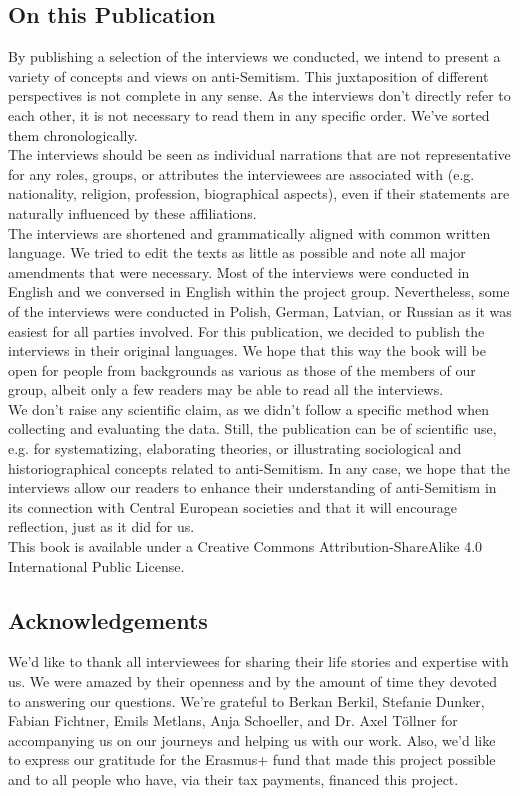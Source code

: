 \subsection*{On this Publication}
By publishing a selection of the interviews we conducted, we intend to present a variety of concepts and views on anti-Semitism. This juxtaposition of different perspectives is not complete in any sense. As the interviews don’t directly refer to each other, it is not necessary to read them in any specific order. We've sorted them chronologically. \\ 
The interviews should be seen as individual narrations that are not representative for any roles, groups, or attributes the interviewees are associated with (e.g. nationality, religion, profession, biographical aspects), even if their statements are naturally influenced by these affiliations. \\
The interviews are shortened and grammatically aligned with common written language. We tried to edit the texts as little as possible and note all major amendments that were necessary. Most of the interviews were conducted in English and we conversed in English within the project group. Nevertheless, some of the interviews were conducted in Polish, German, Latvian, or Russian as it was easiest for all parties involved. For this publication, we decided to publish the interviews in their original languages.  We hope that this way the book will be open for people from backgrounds as various as those of the members of our group, albeit only a few readers may be able to read all the interviews.\\
We don’t raise any scientific claim, as we didn’t follow a specific method when collecting and evaluating the data. Still, the publication can be of scientific use, e.g. for systematizing, elaborating theories, or illustrating sociological and historiographical concepts related to anti-Semitism. In any case, we hope that the interviews allow our readers to enhance their understanding of anti-Semitism in its connection with Central European societies and that it will encourage reflection, just as it did for us. \\
This book is available under a Creative Commons Attribution-ShareAlike 4.0 International Public License. 
\subsection*{Acknowledgements}
We’d like to thank all interviewees for sharing their life stories and expertise with us. We were amazed by their openness and by the amount of time they devoted to answering our questions. We're grateful to Berkan Berkil, Stefanie Dunker, Fabian Fichtner, Emils Metlans, Anja Schoeller, and Dr. Axel Töllner for accompanying us on our journeys and helping us with our work. Also, we'd like to express our gratitude for the Erasmus+ fund that made this project possible and to all people who have, via their tax payments, financed this project. 

